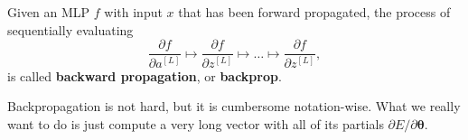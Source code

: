   \begin{definition}
    \label{def:backward-propagation}
    Given an MLP $f$ with input $x$ that has been forward propagated, the process of sequentially evaluating 
    \begin{equation}
      \frac{\partial f}{\partial a^{[L]}} \mapsto \frac{\partial f}{\partial z^{[L]}} \mapsto \ldots \mapsto \frac{\partial f}{\partial z^{[L]}}, 
    \end{equation}
    is called \textbf{backward propagation}, or \textbf{backprop}. 
  \end{definition}

  Backpropagation is not hard, but it is cumbersome notation-wise. What we really want to do is just compute a very long vector with all of its partials $\partial E / \partial \boldsymbol{\theta}$. 

